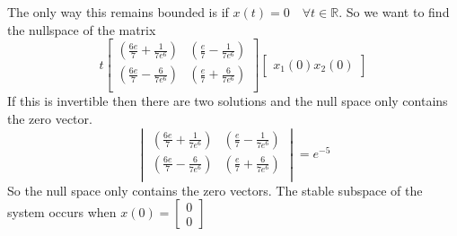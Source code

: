 \documentclass{article}
\begin{document}
The only way this remains bounded is if $x(t) = 0 \quad \forall t \in \mathbb{R}$.
So we want to find the nullspace of the matrix
$$
t
\begin{bmatrix}
\left(\frac{6 e }{7}+\frac{1}{7 e^6}\right) & \left(\frac{e}{7}-\frac{1}{7 e^6}\right) \\
\left(\frac{6 e }{7}-\frac{6}{7 e^6}\right) & \left(\frac{e}{7}+\frac{6}{7 e^6}\right) \\
\end{bmatrix}
\begin{bmatrix}
x_1(0)
x_2(0)
\end{bmatrix}
$$
If this is invertible then there are two solutions and the null space only contains the zero vector.
$$
\begin{vmatrix}
\left(\frac{6 e }{7}+\frac{1}{7 e^6}\right) & \left(\frac{e}{7}-\frac{1}{7 e^6}\right) \\
\left(\frac{6 e }{7}-\frac{6}{7 e^6}\right) & \left(\frac{e}{7}+\frac{6}{7 e^6}\right) \\
\end{vmatrix}
=
e^{-5}
$$
So the null space only contains the zero vectors.
\newline
The stable subspace of the system occurs when $x(0) = \begin{bmatrix} 0 \\ 0 \end{bmatrix}$

\newpage
\end{document}
